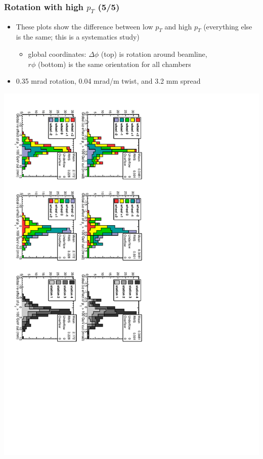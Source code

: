 \documentclass[compress]{beamer}
\begin{document}
\begin{frame}
\frametitle{Rotation with high $p_T$ (5/5)}

\begin{itemize}
\item These plots show the difference between low $p_T$ and high $p_T$ (everything else is the same; this is a systematics study)
\begin{itemize}
\item global coordinates: $\Delta \phi$ (top) is rotation around beamline, \\ $r\phi$ (bottom) is the same orientation for all chambers
\end{itemize}
\item 0.35 mrad rotation, 0.04 mrad/m twist, and 3.2 mm spread
\end{itemize}

\includegraphics[height=\linewidth, angle=90]{data_effect_of_100GeVcut3.pdf}
\end{frame}
\end{document}
